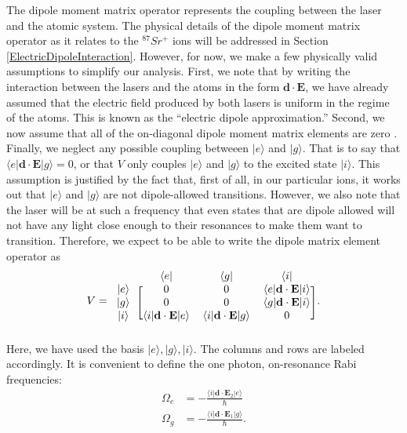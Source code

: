 The dipole moment matrix operator represents the coupling between the laser and the atomic system. The physical details of the dipole moment matrix operator as it relates to the $^{87}Sr^+$ ions will be addressed in Section\,\ref{ElectricDipoleInteraction}. 
However, for now, we make a few physically valid assumptions to simplify our analysis. First, we note that by writing the interaction between the lasers and the atoms in the form $\mathbf{d}\cdot\mathbf{E}$, we have already assumed that the electric field produced by both lasers is uniform in the regime of the atoms. This is known as the ``electric dipole approximation.'' Second, we now assume that all of the on-diagonal dipole moment matrix elements are zero \cite{cohenTannoudji}. Finally, we neglect any possible coupling betweeen $|e\rangle$ and $|g\rangle$. That is to say that $\langle e|\mathbf{d}\cdot\mathbf{E}|g\rangle=0$, or that $V$ only couples $|e\rangle$ and $|g\rangle$ to the excited state $|i\rangle$. This assumption is justified by the fact that, first of all, in our particular ions, it works out that $|e\rangle$ and $|g\rangle$ are not dipole-allowed transitions. However, we also note that the laser will be at such a frequency that even states that are dipole allowed will not have any light close enough to their resonances to make them want to transition. Therefore, we expect to be able to write the dipole matrix element operator as 
\begin{equation}
\label{VSchrod}
V=
\begin{blockarray}{cccc}
&\langle e| & \langle g| & \langle i|\\
\begin{block}{c[ccc]}
|e\rangle & 0 & 0 & \langle e |\mathbf{d}\cdot\mathbf{E}|i\rangle\\
|g\rangle & 0 & 0 & \langle g |\mathbf{d}\cdot\mathbf{E}|i\rangle\\
|i\rangle & \langle i |\mathbf{d}\cdot\mathbf{E}|e\rangle & \langle i |\mathbf{d}\cdot\mathbf{E}|g\rangle& 0 \\
\end{block} 
\end{blockarray}.
\end{equation}
Here, we have used the basis $|e\rangle,|g\rangle,|i\rangle$. The columns and rows are labeled accordingly.
It is convenient to define the one photon, on-resonance Rabi frequencies:
\begin{align}
\label{RabiFrequencies1}
\Omega_e&=-\frac{\langle i | \mathbf{d}\cdot \mathbf{E}_2 | e\rangle }{\hbar}\\
\Omega_g&=-\frac{\langle i | \mathbf{d}\cdot \mathbf{E}_1 | g\rangle}{\hbar}.
\label{RabiFrequencies2}
\end{align}
